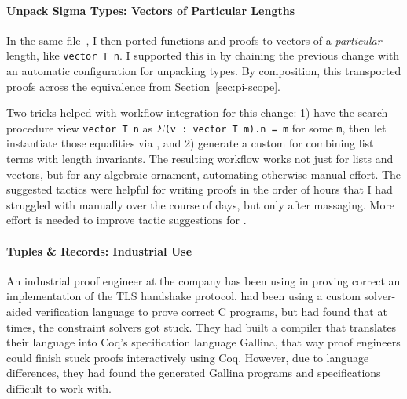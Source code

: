 \paragraph{Unpack Sigma Types: Vectors of Particular Lengths}
In the same file~\href{https://github.com/uwplse/pumpkin-pi/blob/v2.0.0/plugin/coq/examples/Example.v}{}, I then ported functions and proofs to 
vectors of a \textit{particular} length, like \lstinline{vector T n}.
I supported this in \toolnamec by chaining the previous change
with an automatic configuration for unpacking \kl{$\Sigma$} types.
By composition, this transported proofs across the equivalence from Section~\ref{sec:pi-scope}.

Two tricks helped with workflow integration for this change:
1) have the search procedure view \lstinline{vector T n} as 
$\Sigma$\lstinline{(v : vector T m).n = m} for some \lstinline{m},
then let \toolnamec instantiate those equalities via , %
and 2) generate a custom  for combining
list terms with length invariants.
The resulting workflow works not just for lists and vectors, but for any algebraic ornament,
automating otherwise manual effort.
The suggested tactics were helpful for writing proofs in the order of hours
that I had struggled with manually over the course of days, but only after massaging.
More effort is needed to improve tactic suggestions for .

\paragraph{Tuples \& Records: Industrial Use}
An industrial proof engineer at the company \company has been using \toolnamec in proving
correct an implementation of the TLS handshake protocol.
\company had been using a custom solver-aided verification language to prove correct C programs,
but had found that at times, the constraint solvers got stuck.
They had built a compiler that translates their language into Coq's specification language Gallina,
that way proof engineers could finish stuck proofs interactively using Coq.
However, due to language differences, they had found the generated Gallina programs and specifications difficult to work with.

